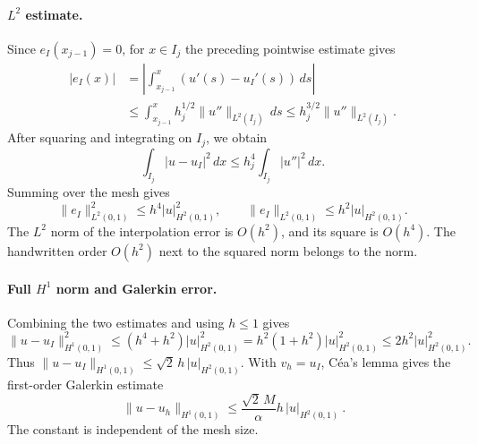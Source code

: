 \documentclass[11pt,a4paper]{article}
\begin{document}
\paragraph{\(L^2\) estimate.}
Since \(e_I(x_{j-1})=0\), for \(x\in I_j\) the preceding pointwise estimate gives
\begin{align*}
 |e_I(x)|
 &=\left|\int_{x_{j-1}}^{x}(u'(s)-u_I'(s))\,ds\right|\\
 &\le \int_{x_{j-1}}^x h_j^{1/2}\|u''\|_{L^2(I_j)}\,ds
 \le h_j^{3/2}\|u''\|_{L^2(I_j)} .
\end{align*}
After squaring and integrating on \(I_j\), we obtain
\[
 \int_{I_j}|u-u_I|^2\,dx\le h_j^4\int_{I_j}|u''|^2\,dx .
\]
Summing over the mesh gives
\[
 \|e_I\|_{L^2(0,1)}^2
    \le h^4|u|_{H^2(0,1)}^2,\qquad
 \|e_I\|_{L^2(0,1)}\le h^2|u|_{H^2(0,1)} .
\]
The \(L^2\) norm of the interpolation error is \(O(h^2)\), and its square is \(O(h^4)\). The handwritten order \(O(h^2)\) next to the squared norm belongs to the norm.

\paragraph{Full \(H^1\) norm and Galerkin error.}
Combining the two estimates and using \(h\le1\) gives
\[
 \|u-u_I\|_{H^1(0,1)}^2
     \le (h^4+h^2)|u|_{H^2(0,1)}^2
     =h^2(1+h^2)|u|_{H^2(0,1)}^2
     \le 2h^2|u|_{H^2(0,1)}^2.
\]
Thus \(\|u-u_I\|_{H^1(0,1)}\le\sqrt2\,h\,|u|_{H^2(0,1)}\).
With \(v_h=u_I\), Céa's lemma gives the first-order Galerkin estimate
\[
 \boxed{\ \|u-u_h\|_{H^1(0,1)}
              \le \frac{\sqrt2\,M}{\alpha}
                       h\,|u|_{H^2(0,1)}\ } .
\]
The constant is independent of the mesh size.
\end{document}
